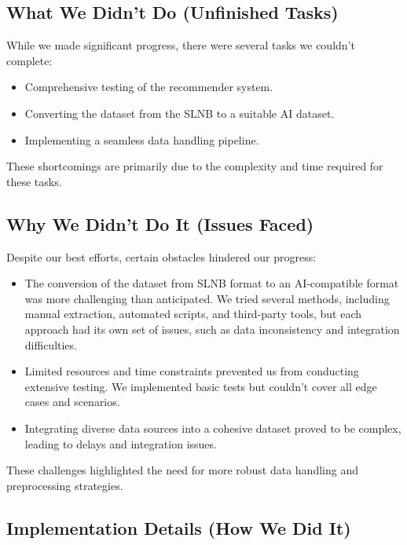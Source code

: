 \documentclass{article}
\begin{document}
\subsection{What We Didn't Do (Unfinished Tasks)}

While we made significant progress, there were several tasks we couldn't complete:
\begin{itemize}
    \item Comprehensive testing of the recommender system.
    \item Converting the dataset from the SLNB to a suitable AI dataset.
    \item Implementing a seamless data handling pipeline.
\end{itemize}
These shortcomings are primarily due to the complexity and time required for these tasks.

\subsection{Why We Didn't Do It (Issues Faced)}

Despite our best efforts, certain obstacles hindered our progress:
\begin{itemize}
    \item The conversion of the dataset from SLNB format to an AI-compatible format was more challenging than anticipated. We tried several methods, including manual extraction, automated scripts, and third-party tools, but each approach had its own set of issues, such as data inconsistency and integration difficulties.
    \item Limited resources and time constraints prevented us from conducting extensive testing. We implemented basic tests but couldn't cover all edge cases and scenarios.
    \item Integrating diverse data sources into a cohesive dataset proved to be complex, leading to delays and integration issues.
\end{itemize}
These challenges highlighted the need for more robust data handling and preprocessing strategies.

\subsection{Implementation Details (How We Did It)}
\end{document}
